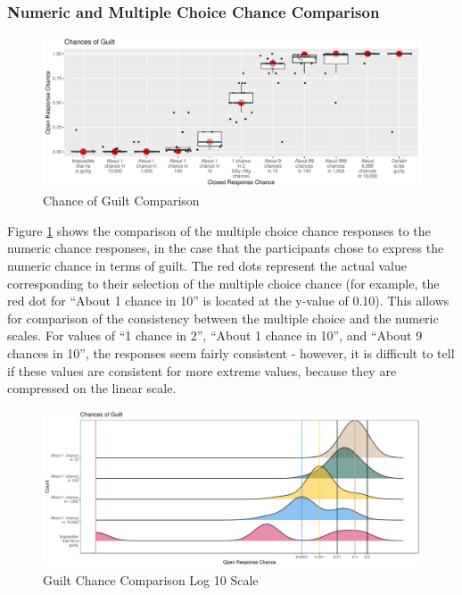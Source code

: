 \documentclass[print]{nuthesis}
\begin{document}
\hypertarget{numeric-and-multiple-choice-chance-comparison}{%
\subsubsection{Numeric and Multiple Choice Chance Comparison}\label{numeric-and-multiple-choice-chance-comparison}}

\begin{figure}

{\centering \includegraphics[width=\linewidth]{thesis_files/figure-latex/likecomp1-1} 

}

\caption{Chance of Guilt Comparison}\label{fig:likecomp1}
\end{figure}

Figure \ref{fig:likecomp1} shows the comparison of the multiple choice chance responses to the numeric chance responses, in the case that the participants chose to express the numeric chance in terms of guilt.
The red dots represent the actual value corresponding to their selection of the multiple choice chance (for example, the red dot for ``About 1 chance in 10'' is located at the y-value of 0.10).
This allows for comparison of the consistency between the multiple choice and the numeric scales.
For values of ``1 chance in 2'', ``About 1 chance in 10'', and ``About 9 chances in 10'', the responses seem fairly consistent - however, it is difficult to tell if these values are consistent for more extreme values, because they are compressed on the linear scale.

\begin{figure}

{\centering \includegraphics[width=\linewidth]{thesis_files/figure-latex/likecomp1scale-1} 

}

\caption{Guilt Chance Comparison Log 10 Scale}\label{fig:likecomp1scale}
\end{figure}
\end{document}
